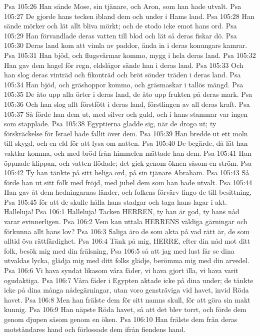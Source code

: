 Psa 105:26  Han sände Mose, sin tjänare, och Aron, som han hade utvalt.
Psa 105:27  De gjorde hans tecken ibland dem och under i Hams land.
Psa 105:28  Han sände mörker och lät allt bliva mörkt; och de stodo icke emot hans ord.
Psa 105:29  Han förvandlade deras vatten till blod och lät så deras fiskar dö.
Psa 105:30  Deras land kom att vimla av paddor, ända in i deras konungars kamrar.
Psa 105:31  Han bjöd, och flugsvärmar kommo, mygg i hela deras land.
Psa 105:32  Han gav dem hagel för regn, eldslågor sände han i deras land.
Psa 105:33  Och han slog deras vinträd och fikonträd och bröt sönder träden i deras land.
Psa 105:34  Han bjöd, och gräshoppor kommo, och gräsmaskar i tallös mängd.
Psa 105:35  De åto upp alla örter i deras land, de åto upp frukten på deras mark.
Psa 105:36  Och han slog allt förstfött i deras land, förstlingen av all deras kraft.
Psa 105:37  Så förde han dem ut, med silver och guld, och i hans stammar var ingen som stapplade.
Psa 105:38  Egyptierna gladde sig, när de drogo ut; ty förskräckelse för Israel hade fallit över dem.
Psa 105:39  Han bredde ut ett moln till skygd, och en eld för att lysa om natten.
Psa 105:40  De begärde, då lät han vaktlar komma, och med bröd från himmelen mättade han dem.
Psa 105:41  Han öppnade klippan, och vatten flödade; det gick genom öknen såsom en ström.
Psa 105:42  Ty han tänkte på sitt heliga ord, på sin tjänare Abraham.
Psa 105:43  Så förde han ut sitt folk med fröjd, med jubel dem som han hade utvalt.
Psa 105:44  Han gav åt dem hedningarnas länder, och folkens förvärv fingo de till besittning,
Psa 105:45  för att de skulle hålla hans stadgar och taga hans lagar i akt. Halleluja!
Psa 106:1  Halleluja! Tacken HERREN, ty han är god, ty hans nåd varar evinnerligen.
Psa 106:2  Vem kan uttala HERRENS väldiga gärningar och förkunna allt hans lov?
Psa 106:3  Saliga äro de som akta på vad rätt är, de som alltid öva rättfärdighet.
Psa 106:4  Tänk på mig, HERRE, efter din nåd mot ditt folk, besök mig med din frälsning,
Psa 106:5  så att jag med lust får se dina utvaldas lycka, glädja mig med ditt folks glädje, berömma mig med din arvedel.
Psa 106:6  Vi hava syndat likasom våra fäder, vi hava gjort illa, vi hava varit ogudaktiga.
Psa 106:7  Våra fäder i Egypten aktade icke på dina under; de tänkte icke på dina många nådegärningar, utan voro gensträviga vid havet, invid Röda havet.
Psa 106:8  Men han frälste dem för sitt namns skull, för att göra sin makt kunnig.
Psa 106:9  Han näpste Röda havet, så att det blev torrt, och förde dem genom djupen såsom genom en öken.
Psa 106:10  Han frälste dem från deras motståndares hand och förlossade dem ifrån fiendens hand.
